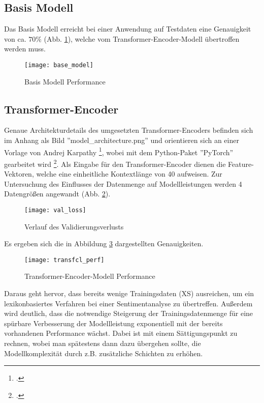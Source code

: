 \subsection{Basis Modell}\label{sec:base_model}

Das Basis Modell erreicht bei einer Anwendung auf Testdaten eine Genauigkeit von ca. $70\%$ (Abb. \ref{fig:base_model}), welche vom Transformer-Encoder-Modell übertroffen werden muss.

\begin{figure}[H]
	\centering
	\texttt{[image: base\_model]}
	\caption{Basis Modell Performance}
	\label{fig:base_model}
	\raggedright
	\vspace{-1.0em}
\end{figure} 

\subsection*{Transformer-Encoder}\label{sec:transfenc}

Genaue Architekturdetails des umgesetzten Transformer-Encoders befinden sich im Anhang als Bild ''model\_architecture.png'' und orientieren sich an einer Vorlage von Andrej Karpathy \footcite{website:nanoGPT}, wobei mit dem Python-Paket ''PyTorch'' gearbeitet wird \footcite{website:PyTorch}. Als Eingabe für den Transformer-Encoder dienen die Feature-Vektoren, welche eine einheitliche Kontextlänge von 40 aufweisen. Zur Untersuchung des Einflusses der Datenmenge auf Modellleistungen werden 4 Datengrößen angewandt (Abb. \ref{fig:val_loss}).

\begin{figure}[H]
	\centering
	\texttt{[image: val\_loss]}
	\caption{Verlauf des Validierungsverlusts}
	\label{fig:val_loss}
	\raggedright
	\vspace{-1.0em}
\end{figure} 

Es ergeben sich die in Abbildung \ref{fig:transfcl_perf} dargestellten Genauigkeiten.

\begin{figure}[H]
	\centering
	\texttt{[image: transfcl\_perf]}
	\caption{Transformer-Encoder-Modell Performance}
	\label{fig:transfcl_perf}
	\raggedright
	\vspace{-1.0em}
\end{figure} 

Daraus geht hervor, dass bereits wenige Trainingsdaten (XS) ausreichen, um ein lexikonbasiertes Verfahren bei einer Sentimentanalyse zu übertreffen. Außerdem wird deutlich, dass die notwendige Steigerung der Trainingsdatenmenge für eine spürbare Verbesserung der Modellleistung exponentiell mit der bereits vorhandenen Performance wächst. Dabei ist mit einem Sättigungspunkt zu rechnen, wobei man spätestens dann dazu übergehen sollte, die Modellkomplexität durch z.B. zusätzliche Schichten zu erhöhen.

